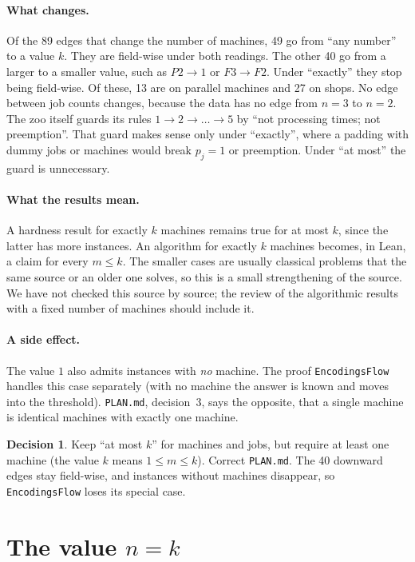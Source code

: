 \documentclass[11pt]{article}
\newcommand{\lean}[1]{\texttt{#1}}
\theoremstyle{definition}
\newtheorem{decision}{Decision}
\begin{document}
\paragraph{What changes.} Of the 89 edges that change the number of
machines, 49 go from ``any number'' to a value $k$. They are field-wise under both
readings. The other 40 go from a larger to a smaller value, such as $P2 \to 1$ or
$F3 \to F2$. Under ``exactly'' they stop being field-wise. Of these, 13 are on
parallel machines and 27 on shops. No edge between job counts changes, because the
data has no edge from $n=3$ to $n=2$. The zoo itself guards its rules
$1 \to 2 \to \dots \to 5$ by ``not processing times; not preemption''. That
guard makes sense only under ``exactly'', where a padding with dummy jobs or
machines would break $p_j=1$ or preemption. Under ``at most'' the guard is
unnecessary.

\paragraph{What the results mean.} A hardness result for exactly $k$
machines remains true for at most $k$, since the latter has more instances.
An algorithm for exactly $k$ machines becomes, in Lean, a claim for every
$m\le k$. The smaller cases are usually classical problems that the same
source or an older one solves, so this is a small strengthening of the source.
We have not checked this source by source; the review of the algorithmic
results with a fixed number of machines should include it.

\paragraph{A side effect.} The value $1$ also admits instances with
\emph{no} machine. The proof \lean{EncodingsFlow} handles this case
separately (with no machine the answer is known and moves into the threshold).
\lean{PLAN.md}, decision~3, says the opposite, that a single machine is
identical machines with exactly one machine.

\begin{decision}
Keep ``at most $k$'' for machines and jobs, but require at least one
machine (the value $k$ means $1 \le m \le k$). Correct \lean{PLAN.md}. The 40
downward edges stay field-wise, and instances without machines disappear,
so \lean{EncodingsFlow} loses its special case.
\end{decision}

\section{The value \texorpdfstring{$n=k$}{n=k}}\label{sec:nk}
\end{document}
